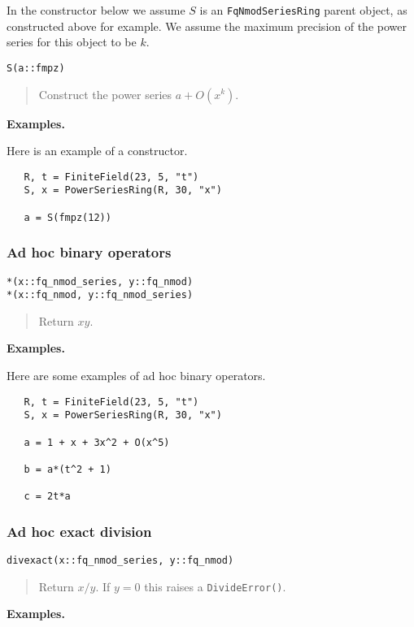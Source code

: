 \documentclass[a4paper,10pt]{article}
\newcommand{\code}{\lstinline}
\newcommand{\desc}[1]{\vspace{-3mm}\begin{quote}#1\end{quote}}
\begin{document}
{{In the constructor below we assume $S$ is an \code{FqNmodSeriesRing} parent object, as
constructed above for example. We assume the maximum precision of the power series
for this object to be $k$.

\begin{lstlisting}
S(a::fmpz)
\end{lstlisting}

\desc{Construct the power series $a + O(x^k)$.}

\textbf{Examples.}

Here is an example of a constructor.

\begin{lstlisting}
   R, t = FiniteField(23, 5, "t")
   S, x = PowerSeriesRing(R, 30, "x")

   a = S(fmpz(12))
\end{lstlisting}

\subsubsection{Ad hoc binary operators}

\begin{lstlisting}
*(x::fq_nmod_series, y::fq_nmod)
*(x::fq_nmod, y::fq_nmod_series)
\end{lstlisting}

\desc{Return $xy$.}

\textbf{Examples.}

Here are some examples of ad hoc binary operators.

\begin{lstlisting}
   R, t = FiniteField(23, 5, "t")
   S, x = PowerSeriesRing(R, 30, "x")

   a = 1 + x + 3x^2 + O(x^5)
   
   b = a*(t^2 + 1)

   c = 2t*a
\end{lstlisting}

\subsubsection{Ad hoc exact division}

\begin{lstlisting}
divexact(x::fq_nmod_series, y::fq_nmod)
\end{lstlisting}

\desc{Return $x/y$. If $y = 0$ this raises a \code{DivideError()}.}

\textbf{Examples.}

}}
\end{document}
